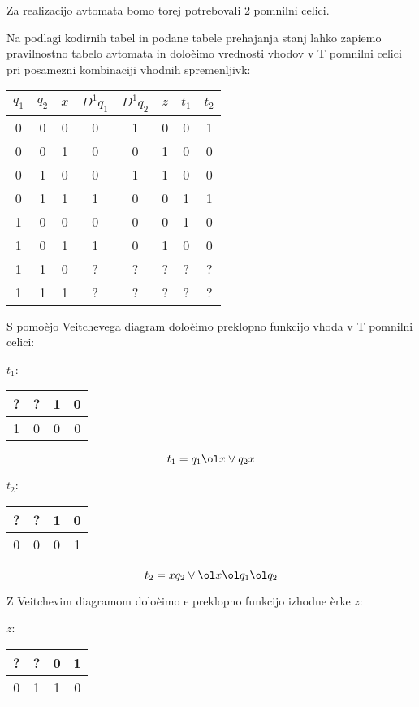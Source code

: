 \begin{zgled}
\bigskip

Za realizacijo avtomata bomo torej potrebovali 2 pomnilni celici.

\bigskip

Na podlagi kodirnih tabel in podane tabele prehajanja stanj lahko zapiemo pravilnostno tabelo avtomata in doloèimo vrednosti vhodov v T pomnilni celici pri posamezni kombinaciji vhodnih spremenljivk:

\bigskip

\begin{tabular}{ccc|ccc|cc}
 $q_1$ & $q_2$ & $x$ & $D^1 q_1$ & $D^1 q_2$ & $z$ & $t_1$ & $t_2$\\
  \hline
 0 & 0 & 0 & 0 & 1 & 0 & 0 & 1\\		 
 0 & 0 & 1 & 0 & 0 & 1 & 0 & 0\\		 
 0 & 1 & 0 & 0 & 1 & 1 & 0 & 0\\		 
 0 & 1 & 1 & 1 & 0 & 0 & 1 & 1\\		 
 1 & 0 & 0 & 0 & 0 & 0 & 1 & 0\\		 
 1 & 0 & 1 & 1 & 0 & 1 & 0 & 0\\		 
 1 & 1 & 0 & ? & ? & ? & ? & ?\\		 
 1 & 1 & 1 & ? & ? & ? & ? & ?\\		 
\end{tabular}

\bigskip

S pomoèjo Veitchevega diagram doloèimo preklopno funkcijo vhoda v T pomnilni celici:

\bigskip
$t_1$:
\begin{tabular}{|c|c|c|c|}
\hline
? & ? & 1 & 0 \\
\hline
1 & 0 & 0 & 0\\
\hline
\end{tabular}

$$
t_1 = q_1 \ol x \vee q_2 x
$$

\bigskip
$t_2$:
\begin{tabular}{|c|c|c|c|}
\hline
? & ? & 1 & 0 \\
\hline
0 & 0 & 0 & 1\\
\hline
\end{tabular}

$$
t_2 = x q_2 \vee \ol x \ol q_1 \ol q_2
$$

\bigskip

Z Veitchevim diagramom doloèimo e preklopno funkcijo izhodne èrke $z$:

\bigskip
$z$:
\begin{tabular}{|c|c|c|c|}
\hline
? & ? & 0 & 1 \\
\hline
0 & 1 & 1 & 0\\
\hline
\end{tabular}


\end{zgled}
